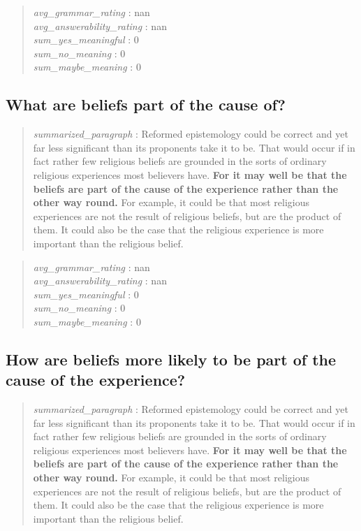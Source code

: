 \begin{quote}
\emph{avg\_grammar\_rating} : nan\\
\emph{avg\_answerability\_rating} : nan\\
\emph{sum\_yes\_meaningful} : 0\\
\emph{sum\_no\_meaning} : 0\\
\emph{sum\_maybe\_meaning} : 0
\end{quote}

\hypertarget{what-are-beliefs-part-of-the-cause-of}{%
\subsection{What are beliefs part of the cause
of?}\label{what-are-beliefs-part-of-the-cause-of}}

\begin{quote}
\emph{summarized\_paragraph} : Reformed epistemology could be correct
and yet far less significant than its proponents take it to be. That
would occur if in fact rather few religious beliefs are grounded in the
sorts of ordinary religious experiences most believers have. \textbf{For
it may well be that the beliefs are part of the cause of the experience
rather than the other way round.} For example, it could be that most
religious experiences are not the result of religious beliefs, but are
the product of them. It could also be the case that the religious
experience is more important than the religious belief.
\end{quote}

\begin{quote}
\emph{avg\_grammar\_rating} : nan\\
\emph{avg\_answerability\_rating} : nan\\
\emph{sum\_yes\_meaningful} : 0\\
\emph{sum\_no\_meaning} : 0\\
\emph{sum\_maybe\_meaning} : 0
\end{quote}

\hypertarget{how-are-beliefs-more-likely-to-be-part-of-the-cause-of-the-experience}{%
\subsection{How are beliefs more likely to be part of the cause of the
experience?}\label{how-are-beliefs-more-likely-to-be-part-of-the-cause-of-the-experience}}

\begin{quote}
\emph{summarized\_paragraph} : Reformed epistemology could be correct
and yet far less significant than its proponents take it to be. That
would occur if in fact rather few religious beliefs are grounded in the
sorts of ordinary religious experiences most believers have. \textbf{For
it may well be that the beliefs are part of the cause of the experience
rather than the other way round.} For example, it could be that most
religious experiences are not the result of religious beliefs, but are
the product of them. It could also be the case that the religious
experience is more important than the religious belief.
\end{quote}

